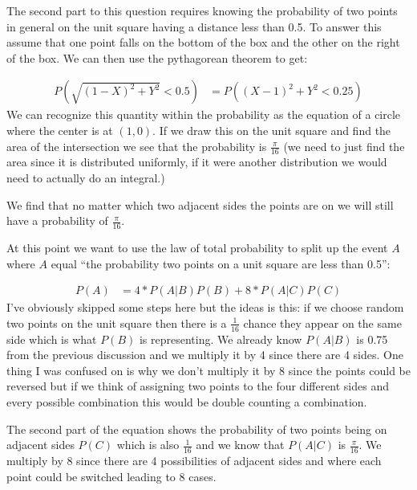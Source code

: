 \begin{enumerate}
The second part to this question requires knowing the probability of two points in general on the unit square having a distance less than 0.5. To answer this assume that one point falls on the bottom of the box and the other on the right of the box. We can then use the pythagorean theorem to get:

\begin{equation}
\begin{split}
P(\sqrt{(1-X)^2 + Y^2} < 0.5) &= P((X-1)^2 + Y^2 < 0.25) 
\end{split}
\end{equation}
\noindent We can recognize this quantity within the probability as the equation of a circle where the center is at $(1,0)$. If we draw this on the unit square and find the area of the intersection we see that the probability is $\frac{\pi}{16}$ (we need to just find the area since it is distributed uniformly, if it were another distribution we would need to actually do an integral.) 

We find that no matter which two adjacent sides the points are on we will still have a probability of $\frac{\pi}{16}$. 

At this point we want to use the law of total probability to split up the event $A$ where $A$ equal ``the probability two points on a unit square are less than 0.5'':

\begin{equation}
\begin{split}
P(A) &= 4*P(A|B)P(B) + 8*P(A|C)P(C)
\end{split}
\end{equation}
\noindent I've obviously skipped some steps here but the ideas is this: if we choose random two points on the unit square then there is a $\frac{1}{16}$ chance they appear on the same side which is what $P(B)$ is representing. We already know $P(A|B)$ is 0.75 from the previous discussion and we multiply it by 4 since there are 4 sides. One thing I was confused on is why we don't multiply it by 8 since the points could be reversed but if we think of assigning two points to the four different sides and every possible combination this would be double counting a combination.

The second part of the equation shows the probability of two points being on adjacent sides $P(C)$ which is also $\frac{1}{16}$ and we know that $P(A|C)$ is $\frac{\pi}{16}$. We multiply by 8 since there are 4 possibilities of adjacent sides and where each point could be switched leading to 8 cases. 


\end{enumerate}
